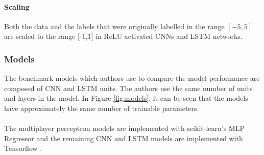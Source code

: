 \documentclass[a4paper,11pt]{article}
\begin{document}
\paragraph{Scaling}
Both the data and the labels that were originally labelled in the range $[-5,5]$ are scaled to the range [-1,1] in ReLU activated CNNs and LSTM networks. 

\subsubsection{Models}

The benchmark models which authors use to compare the model performance are composed of CNN and LSTM units. The authors use the same number of units and layers in the model. In Figure \ref{fig:models}, it can be seen that the models have approximately the same number of trainable parameters. 
\\
\\
The multiplayer perceptron models are implemented with scikit-learn's MLP Regressor \cite{scikit-learn} and the remaining CNN and LSTM models are implemented with Tensorflow \cite{tensorflow2015-whitepaper}.
\end{document}
